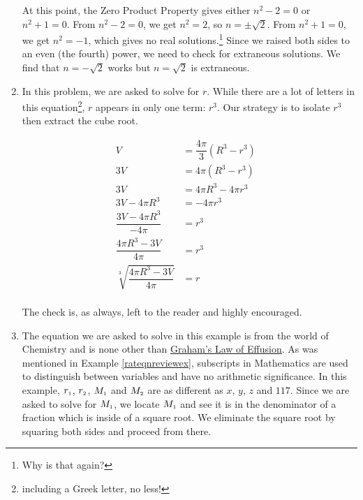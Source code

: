 \begin{ex}
\begin{enumerate}
At this point, the Zero Product Property gives either $n^2 - 2 = 0$ or $n^2 + 1 = 0$.  From $n^2 - 2 = 0$, we get $n^2 = 2$, so $n = \pm \sqrt{2}$.  From $n^2 + 1 = 0$, we get $n^2 = -1$, which gives no real solutions.\footnote{Why is that again?}  Since we raised both sides to an even (the fourth) power, we need to check for extraneous solutions. We find that $n = -\sqrt{2}$ works but $n = \sqrt{2}$ is extraneous.

\item In this problem, we are asked to solve for $r$. While there are a lot of letters in this equation\footnote{including a Greek letter, no less!}, $r$ appears in only one term:  $r^3$.  Our strategy is to isolate $r^3$ then extract the cube root.

\begin{align*}
V & = \dfrac{4\pi}{3}(R^3 - r^3) \\ 
3V & = 4\pi (R^3 - r^3) & \tag{Multiply by $3$ to clear fractions}\\
3V & = 4\pi R^3 - 4\pi r^3 \tag{Distribute} \\
3V - 4\pi R^3 & = -4 \pi r^3 \tag{Subtract $4 \pi R^3$} \\
\dfrac{3V - 4\pi R^3}{-4\pi} & = r^3 \tag{Divide by $-4\pi$} \\
\dfrac{4\pi R^3 - 3V}{4\pi} & = r^3 \tag{Properties of Negatives} \\
\sqrt[3]{\dfrac{4\pi R^3 - 3V}{4\pi}} & = r \tag{Extract the cube root} \\
\end{align*}

The check is, as always, left to the reader and highly encouraged.

\item  The equation we are asked to solve in this example is from the world of Chemistry and is none other than \href{http://en.wikipedia.org/wiki/Graham's_law}{\underline{Graham's Law of Effusion}}.  As was mentioned in Example \ref{rateqnreviewex}, subscripts in Mathematics are used to distinguish between variables and have no arithmetic significance.  In this example, $r_{\text{\tiny$1$}}$, $r_{\text{\tiny$2$}}$, $M_{\text{\tiny$1$}}$ and $M_{\text{\tiny$2$}}$ are as different as $x$, $y$, $z$ and $117$.  Since we are asked to solve for $M_{\text{\tiny$1$}}$, we locate $M_{\text{\tiny$1$}}$ and see it is in the denominator of a fraction which is inside of a square root.  We eliminate the square root by squaring both sides and proceed from there.


\end{enumerate}
\end{ex}
